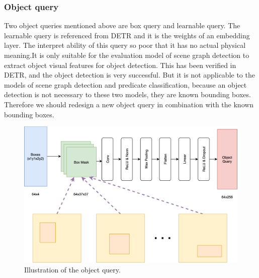 




\subsubsection{Object query}
Two object queries mentioned above are box query and learnable query. The learnable query is referenced from DETR and it is the weights of an embedding layer. The interpret ability of this query so poor that it has no actual physical meaning.It is only suitable for the evaluation model of scene graph detection to extract object visual features for object detection. This has been verified in DETR, and the object detection is very successful. But it is not applicable to the models of scene graph detection and predicate classification, because an object detection is not necessary to these two models, they are known bounding boxes. Therefore we should redesign a new object query in combination with the known bounding boxes.

\begin{figure}[tbph!]
	\centering
	\includegraphics[width=0.8\linewidth]{figures/object_query}
	\caption[Illustration of the object query]{Illustration of the object query.}
	\label{fig:objectquery}
\end{figure}


